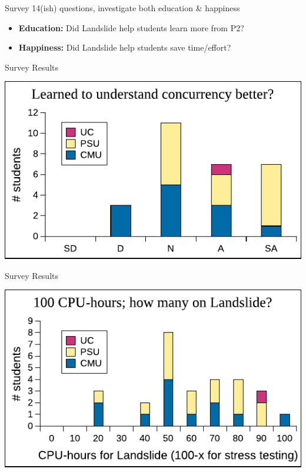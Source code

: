 \documentclass[xcolor=dvipsnames]{beamer}
\begin{document}
\begin{frame}{Survey}
	14(ish) questions, investigate both education \& happiness
	\begin{itemize}
		\item {\bf Education:} Did Landslide help students learn more from P2?
		\item {\bf Happiness:} Did Landslide help students save time/effort?
	\end{itemize}
\end{frame}

\begin{frame}{Survey Results} %
	\begin{center}
		\includegraphics[width=\textwidth]{../survey8.pdf} %
	\end{center}
\end{frame}

\begin{frame}{Survey Results} %
	\begin{center}
		\includegraphics[width=\textwidth]{../survey9.pdf} %
	\end{center}
\end{frame}
\end{document}
